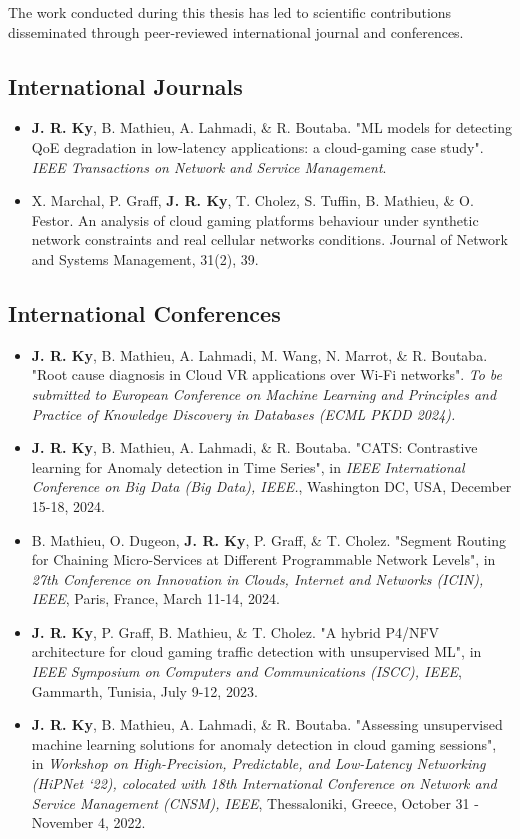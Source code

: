 The work conducted during this thesis has led to scientific contributions disseminated through peer-reviewed international journal and conferences.

\subsection*{International Journals}

\begin{itemize}
    \item \textbf{J. R. Ky}, B. Mathieu, A. Lahmadi, \& R. Boutaba. "ML models for detecting QoE degradation in low-latency applications: a cloud-gaming case study". \textit{IEEE Transactions on Network and Service Management}.
    \item X. Marchal, P. Graff, \textbf{J. R. Ky}, T. Cholez, S. Tuffin, B. Mathieu, \& O. Festor. An analysis of cloud gaming platforms behaviour under synthetic network constraints and real cellular networks conditions. Journal of Network and Systems Management, 31(2), 39.
\end{itemize}


\subsection*{International Conferences}

\begin{itemize}
    \item \textbf{J. R. Ky}, B. Mathieu, A. Lahmadi, M. Wang, N. Marrot, \& R. Boutaba. "Root cause diagnosis in Cloud VR applications over Wi-Fi networks". \textit{To be submitted to European Conference on Machine Learning and Principles and Practice of Knowledge Discovery in Databases (ECML PKDD 2024).}
    
    \item \textbf{J. R. Ky}, B. Mathieu, A. Lahmadi, \& R. Boutaba. "CATS: Contrastive learning for Anomaly detection in Time Series", in \textit{IEEE International Conference on Big Data (Big Data), IEEE.}, Washington DC, USA, December 15-18, 2024.
    
    \item B. Mathieu, O. Dugeon, \textbf{J. R. Ky}, P. Graff, \& T. Cholez. "Segment Routing for Chaining Micro-Services at Different Programmable Network Levels", in \textit{27th Conference on Innovation in Clouds, Internet and Networks (ICIN), IEEE}, Paris, France, March 11-14, 2024.

    \item \textbf{J. R. Ky}, P. Graff, B. Mathieu, \& T. Cholez. "A hybrid P4/NFV architecture for cloud gaming traffic detection with unsupervised ML", in \textit{IEEE Symposium on Computers and Communications (ISCC), IEEE}, Gammarth, Tunisia, July 9-12, 2023.

    \item \textbf{J. R. Ky}, B. Mathieu, A. Lahmadi, \& R. Boutaba. "Assessing unsupervised machine learning solutions for anomaly detection in cloud gaming sessions", in \textit{Workshop on High-Precision, Predictable, and Low-Latency Networking (HiPNet ‘22), colocated with 18th International Conference on Network and Service Management (CNSM), IEEE}, Thessaloniki, Greece, October 31 - November 4, 2022. 
\end{itemize}